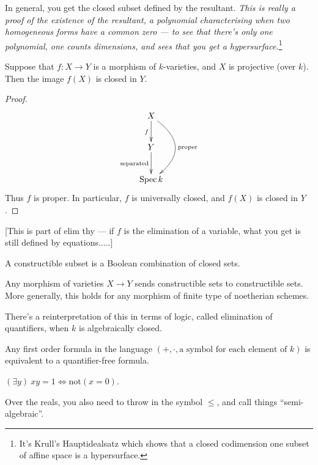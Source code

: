 \documentclass[11pt]{article}
\begin{document}
\begin{Oct20}
\begin{exmp*}
In general, you get the closed subset defined by the resultant. \emph{This is really a proof of the existence of the resultant, a polynomial characterising when two homogeneous forms have a common zero --- to see that there's only one polynomial, one counts dimensions, and sees that you get a hypersurface.}\footnote{It's Krull's Hauptidealsatz which shows that a closed codimension one subset of affine space is a hypersurface.}
\end{exmp*}
\begin{thm*}
Suppose that $f:X\to Y$ is a morphism of $k$-varieties, and $X$ is projective (over $k$). Then the image $f(X)$ is closed in $Y$.
\end{thm*}
\begin{proof}
\[\xymatrix{
X\ar[d]_f\ar@/^1cm/[dd]^{\text{proper}}\\%
Y\ar[d]_{\text{separated}}\\
\spec k
}\]
Thus $f$ is proper. In particular, $f$ is universally closed, and $f(X)$ is closed in $Y$.
\end{proof}
[This is part of elim thy --- if $f$ is the elimination of a variable, what you get is still defined by equations.....]
\begin{defn*}
A constructible subset is a Boolean combination of closed sets.
\end{defn*}
\begin{thm*}[Chevalley]
Any morphism of varieties $X\to Y$ sends constructible sets to constructible sets. More generally, this holds for any morphism of finite type of noetherian schemes.
\end{thm*}
There's a reinterpretation of this in terms of logic, called elimination of quantifiers, when $k$ is algebraically closed.
\begin{thm*}
Any first order formula in the language $(+,\cdot,\text{a symbol for each element of $k$})$ is equivalent to a quantifier-free formula.
\end{thm*}
\begin{exmp*}
$(\exists y)\ xy=1\iff \text{not}(x=0)$.
\end{exmp*}
\noindent Over the reals, you also need to throw in the symbol $\leq$, and call things ``semi-algebraic''.
\end{Oct20}
\end{document}
